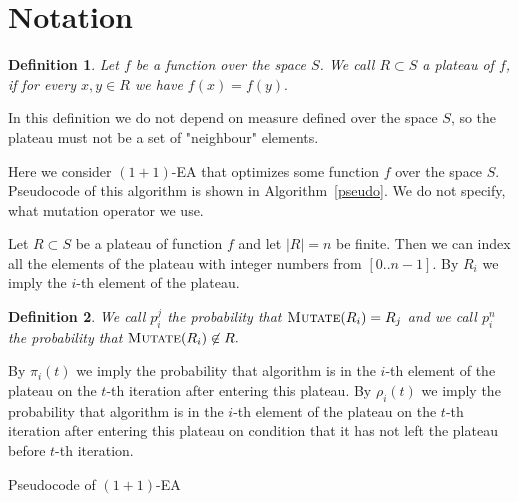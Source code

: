 \documentclass{article}
\newtheorem{definition}{Definition}
\begin{document}
\section{Notation}
  \begin{definition}
    Let $f$ be a function over the space $S$. We call $R \subset S$ a plateau of $f$, if for every $x, y \in R$ we have $f(x) = f(y).$
  \end{definition}

  In this definition we do not depend on measure defined over the space $S$, so the plateau must not be a set of "neighbour" elements.

  Here we consider $(1 + 1)$-EA that optimizes some function $f$ over the space $S$. Pseudocode of this algorithm is shown in Algorithm~\ref{pseudo}. We do not specify, what mutation operator we use.

  Let $R \subset S$ be a plateau of function $f$ and let $|R| = n$ be finite. Then we can index all the elements of the plateau with integer numbers from $[0..n-1].$ By $R_i$ we imply the $i$-th element of the plateau.

  \begin{definition}
    We call $p_i^j$ the probability that $\textsc{Mutate}(R_i) = R_j$ and we call $p_i^n$ the probability that $\textsc{Mutate}(R_i) \not\in R.$
  \end{definition}

  By $\pi_i(t)$ we imply the probability that algorithm is in the $i$-th element of the plateau on the $t$-th iteration after entering this plateau. By $\rho_i(t)$ we imply the probability that algorithm is in the $i$-th element of the plateau on the $t$-th iteration after entering this plateau on condition that it has not left the plateau before $t$-th iteration.

  \begin{algorithm}[!t]
  \begin{center}
      \begin{algorithmic}[1]
              \EndIf
          \EndWhile
      \end{algorithmic}
      \caption{Pseudocode of $(1 + 1)$-EA}
      \label{pseudo}
  \end{center}
  \end{algorithm}
\end{document}
